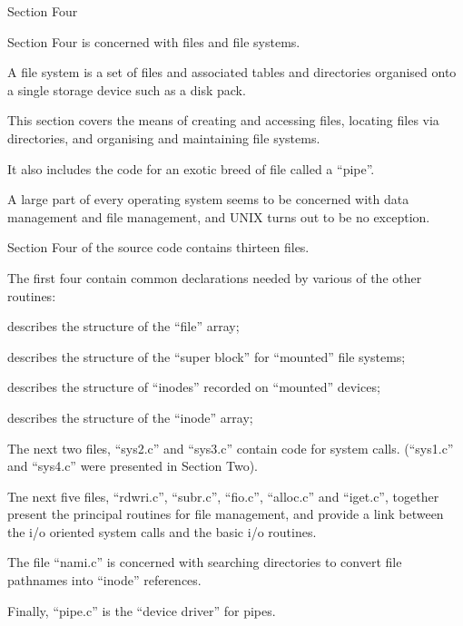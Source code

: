%
%
{\noindent \Large Section Four}

{\sf Section Four is concerned with files
and file systems.

A file system is a set of files and
associated tables and directories
organised onto a single storage device
such as a disk pack.

This section covers the means of
creating and accessing files,
locating files via directories, and
organising and maintaining
file systems.

It also includes the code for an exotic
breed of file called a ``pipe''.
}




A large part of every operating system
seems to be concerned with data management and file management, and UNIX
turns out to be no exception.


Section Four of the source code contains thirteen files.


The first four contain common declarations needed by various of the other
routines:

\bd
\item[``file.h''] describes the structure
of the ``file'' array;

\item[``filsvs.h''] describes the structure
of the ``super block'' for ``mounted''
file systems;

\item[``ino.h''] describes the structure of
``inodes'' recorded on ``mounted''
devices;

\item[``inode.h''] describes the structure
of the ``inode'' array;
\ed

The next two files, ``sys2.c'' and
``sys3.c'' contain code for system calls.
(``sys1.c'' and ``sys4.c'' were presented
in Section Two).

Tne next five files, ``rdwri.c'',
``subr.c'', ``fio.c'', ``alloc.c'' and
``iget.c'', together present the principal routines for file management, and
provide a link between the i/o oriented
system calls and the basic i/o routines.

The file ``nami.c'' is concerned with
searching directories to convert file
pathnames into ``inode'' references.

Finally, ``pipe.c'' is the ``device
driver'' for pipes.



